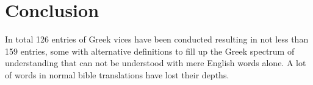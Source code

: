 \section{Conclusion}

In total 126 entries of Greek vices have been conducted resulting in not less than 159 entries, some with alternative definitions to fill up the Greek spectrum of understanding that can not be understood with mere English words alone. A lot of words in normal bible translations have lost their depths.
